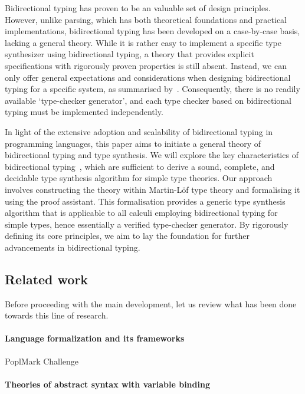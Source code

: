 Bidirectional typing has proven to be an valuable set of design principles.
However, unlike parsing, which has both theoretical foundations and practical implementations, bidirectional typing has been developed on a case-by-case basis, lacking a general theory.
While it is rather easy to implement a specific type synthesizer using bidirectional typing, a theory that provides explicit specifications with rigorously proven properties is still absent.
Instead, we can only offer general expectations and considerations when designing bidirectional typing for a specific system, as summarised by~\citet{Dunfield2021}.
Consequently, there is no readily available `type-checker generator', and each type checker based on bidirectional typing must be implemented independently.

In light of the extensive adoption and scalability of bidirectional typing in programming languages, this paper aims to initiate a general theory of bidirectional typing and type synthesis. 
We will explore the key characteristics of bidirectional typing~\citep{Dunfield2021}, which are sufficient to derive a sound, complete, and decidable type synthesis algorithm for simple type theories.
Our approach involves constructing the theory within Martin-L\"of type theory and formalising it using the \Agda proof assistant.
This formalisation provides a generic type synthesis algorithm that is applicable to all calculi employing bidirectional typing for simple types, hence essentially a verified type-checker generator.
By rigorously defining its core principles, we aim to lay the foundation for further advancements in bidirectional typing.

\subsection{Related work}
Before proceeding with the main development, let us review what has been done towards this line of research.

\citep{Xie2018}
\paragraph{Language formalization and its frameworks}
\cite{Wadler2022}
PoplMark Challenge~\citep{Aydemir2005}

\cite{Cimini2020,Cimini2022}

\citep{Ahrens2018,Fiore2022,Gheri2020,Ahrens2022}
\cite{Allais2021}

\paragraph{Theories of abstract syntax with variable binding}
\cite{Fiore1999,Hirschowitz2010,Ahrens2018,Fiore2022,Ahrens2021,Arkor2020,Hirschowitz2022}
\cite{Fiore2013,Hamana2011,Hamana2022}


